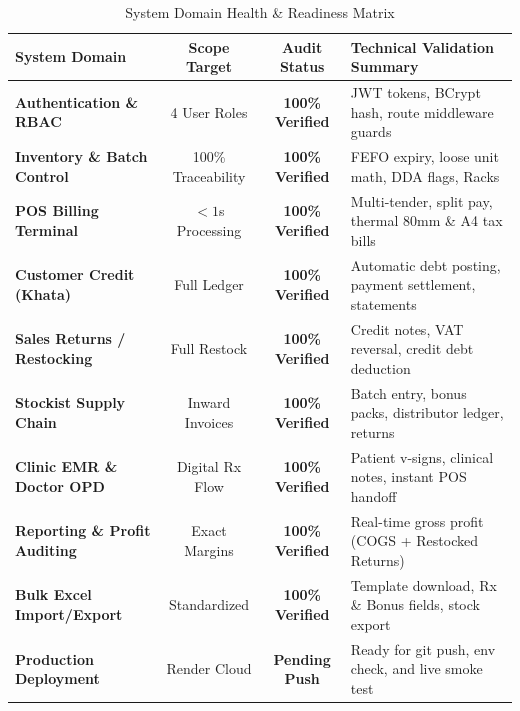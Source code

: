 \documentclass[10pt,a4paper]{article}
\begin{document}
\vspace{0.3cm}

\begin{table}[h!]
\centering
\small
\begin{tabularx}{\textwidth}{>{\bfseries\color{NavyDark}}p{3.8cm}cc>{\color{SlateDark}}X}
\toprule
\rowcolor{NavyDark}
\color{white}System Domain & \color{white}Scope Target & \color{white}Audit Status & \color{white}Technical Validation Summary \\
\midrule
Authentication \& RBAC & 4 User Roles & \color{EmeraldSuccess}\textbf{100\% Verified} & JWT tokens, BCrypt hash, route middleware guards \\
\rowcolor{SlateLight}
Inventory \& Batch Control & 100\% Traceability & \color{EmeraldSuccess}\textbf{100\% Verified} & FEFO expiry, loose unit math, DDA flags, Racks \\
POS Billing Terminal & $< 1$s Processing & \color{EmeraldSuccess}\textbf{100\% Verified} & Multi-tender, split pay, thermal 80mm \& A4 tax bills \\
\rowcolor{SlateLight}
Customer Credit (Khata) & Full Ledger & \color{EmeraldSuccess}\textbf{100\% Verified} & Automatic debt posting, payment settlement, statements \\
Sales Returns / Restocking & Full Restock & \color{EmeraldSuccess}\textbf{100\% Verified} & Credit notes, VAT reversal, credit debt deduction \\
\rowcolor{SlateLight}
Stockist Supply Chain & Inward Invoices & \color{EmeraldSuccess}\textbf{100\% Verified} & Batch entry, bonus packs, distributor ledger, returns \\
Clinic EMR \& Doctor OPD & Digital Rx Flow & \color{EmeraldSuccess}\textbf{100\% Verified} & Patient v-signs, clinical notes, instant POS handoff \\
\rowcolor{SlateLight}
Reporting \& Profit Auditing & Exact Margins & \color{EmeraldSuccess}\textbf{100\% Verified} & Real-time gross profit (COGS + Restocked Returns) \\
Bulk Excel Import/Export & Standardized & \color{EmeraldSuccess}\textbf{100\% Verified} & Template download, Rx \& Bonus fields, stock export \\
\rowcolor{SlateLight}
Production Deployment & Render Cloud & \color{AmberWarning}\textbf{Pending Push} & Ready for git push, env check, and live smoke test \\
\bottomrule
\end{tabularx}
\caption{System Domain Health \& Readiness Matrix}
\end{table}
\end{document}
